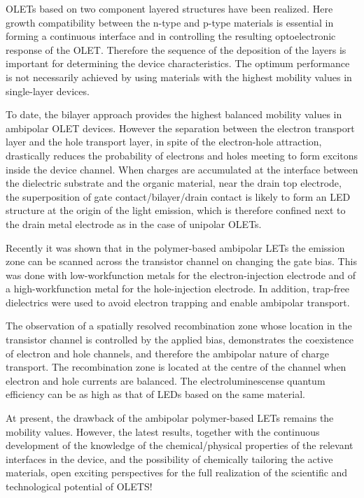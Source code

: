 OLETs based on two component layered structures have been realized. Here growth compatibility between the n-type and p-type materials is essential in forming a continuous interface and in controlling the resulting optoelectronic response of the OLET. Therefore the sequence of the deposition of the layers is important for determining the device characteristics. The optimum performance is not necessarily achieved by using materials with the highest mobility values in single-layer devices. 

To date, the bilayer approach provides the highest balanced mobility values in ambipolar OLET devices. However the separation between the electron transport layer and the hole transport layer, in spite of the electron-hole attraction, drastically reduces the probability of electrons and holes meeting to form excitons inside the device channel. When charges are accumulated at the interface between the dielectric substrate and the organic material, near the drain top electrode, the superposition of gate contact/bilayer/drain contact is likely to form an LED structure at the origin of the light emission, which is therefore confined next to the drain metal electrode as in the case of unipolar OLETs.

Recently it was shown that in the polymer-based ambipolar LETs the emission zone can be scanned across the transistor channel on changing the gate bias. This was done with low-workfunction metals for the electron-injection electrode and of a high-workfunction metal for the hole-injection electrode. In addition, trap-free dielectrics were used to avoid electron trapping and enable ambipolar transport. 

The observation of a spatially resolved recombination zone whose location in the transistor channel is controlled by the applied bias, demonstrates the coexistence of electron and hole channels, and therefore the ambipolar nature of charge transport. The recombination zone is located at the centre of the channel when electron and hole currents are balanced. The electroluminescense quantum efficiency can be as high as that of LEDs based on the same material. 

At present, the drawback of the ambipolar polymer-based LETs remains the mobility values. However, the latest results, together with the continuous development of the knowledge of the chemical/physical properties of the relevant interfaces in the device, and the possibility of chemically tailoring the active materials, open exciting perspectives for the full realization of the scientific and technological potential of OLETS!




